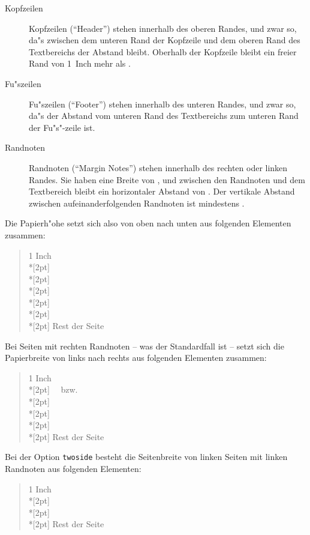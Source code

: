 \begin{description}
\item[Kopfzeilen]
        Kopfzeilen ("`Header"') stehen innerhalb des oberen Randes, und 
        zwar so, da"s zwischen dem unteren Rand der Kopfzeile und dem 
        oberen Rand des Textbereichs der Abstand  
        bleibt. Oberhalb der Kopfzeile bleibt ein freier Rand von 
        1~Inch mehr als .

\item[Fu"szeilen]
        Fu"szeilen ("`Footer"') stehen innerhalb des unteren Randes, 
        und zwar so, da"s der Abstand vom unteren Rand des 
        Textbereichs zum unteren Rand der Fu"s"-zeile  ist.

\item[Randnoten]
        Randnoten ("`Margin Notes"') stehen innerhalb des rechten oder 
        linken Randes. Sie haben eine Breite von , und zwischen den Randnoten und dem 
        Textbereich bleibt ein horizontaler Abstand von . Der vertikale Abstand zwischen 
        aufeinanderfolgenden Randnoten ist mindestens .

\end{description}

Die Papierh"ohe setzt sich also von oben nach unten
aus folgenden Elementen zusammen:
\begin{verse}
\rm 1 Inch \\*[2pt]
 \\*[2pt]
 \\*[2pt]
 \\*[2pt]
 \\*[2pt]
 \\*[2pt]
\rm Rest der Seite
\end{verse}

Bei Seiten mit rechten Randnoten
-- was der Standardfall ist --
setzt sich die Papierbreite
von links nach rechts aus folgenden Elementen zusammen:
\begin{verse}
1 Inch \\*[2pt]
\ \ bzw.\ \  \\*[2pt]
 \\*[2pt]
 \\*[2pt]
 \\*[2pt]
\rm Rest der Seite
\end{verse}
Bei der Option \texttt{twoside} besteht die Seitenbreite
von linken Seiten mit linken Randnoten
aus folgenden Elementen:
\begin{verse}
\rm 1 Inch \\*[2pt]
 \\*[2pt]
 \\*[2pt]
\rm Rest der Seite
\end{verse}

